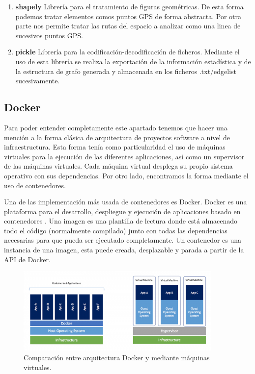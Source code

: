 \begin{enumerate}[label={L.\arabic*.}]
\item \textbf{shapely} Librería para el tratamiento de figuras geométricas. De esta forma podemos tratar elementos comos puntos \ac{GPS} de forma abstracta. Por otra parte nos permite tratar las rutas del espacio a analizar como una linea de sucesivos puntos \ac{GPS}.
\item \textbf{pickle} Librería para la codificación-decodificación de ficheros. Mediante el uso de esta librería se realiza la exportación de la información estadística y de la estructura de grafo generada y almacenada en los ficheros .txt/edgelist sucesivamente.
\end{enumerate}

\subsection{Docker}
Para poder entender completamente este apartado tenemos que hacer una mención a la forma clásica de arquitectura de 
proyectos software a nivel de infraestructura. Esta forma tenía como particularidad el uso de máquinas virtuales para la 
ejecución de las diferentes aplicaciones, así como un supervisor de las máquinas virtuales.  Cada máquina virtual desplega
su propio sistema operativo con sus dependencias. Por otro lado, encontramos la forma mediante el uso de contenedores.

Una de las implementación más usada de contenedores es Docker. Docker es una plataforma para el desarrollo, despliegue y ejecución de aplicaciones basado en contenedores \cite{Docker01}.  Una imagen es 
una plantilla de lectura donde está almacenado todo el código (normalmente compilado) junto con todas las dependencias 
necesarias para que pueda ser ejecutado completamente. Un contenedor es una instancia de una imagen, esta puede creada, 
desplazable y parada a partir de la \ac{API} de Docker.

\begin{figure}[!htb]
\begin{center}
\includegraphics[width=0.9\textwidth]{./Imagenes/DockerComparision.png}
\caption{Comparación entre arquitectura Docker y mediante máquinas virtuales. \cite{Docker02}}
\label{DockerComparision}
\end{center}
\end{figure}


